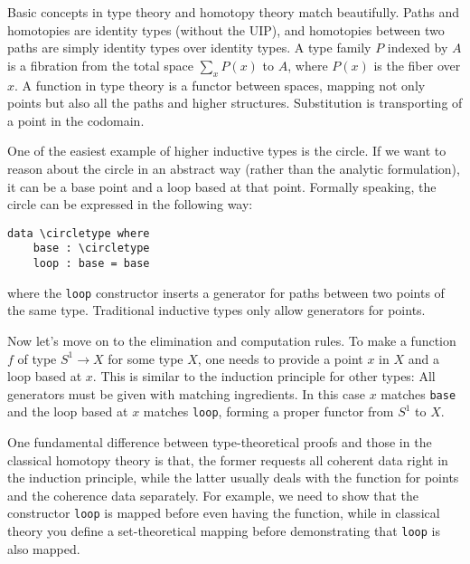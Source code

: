 \documentclass{article}
\begin{document}
Basic concepts in type theory and homotopy theory match beautifully.
Paths and homotopies are identity types (without the UIP),
and homotopies between two paths are simply identity types over identity types.
A type family $P$ indexed by $A$ is a fibration from the total space $\sum_x P(x)$ to $A$,
where $P(x)$ is the fiber over $x$.
A function in type theory is a functor between spaces,
mapping not only points but also all the paths and higher structures.
Substitution is transporting of a point in the codomain.

One of the easiest example of higher inductive types is the circle.
If we want to reason about the circle in an abstract way
(rather than the analytic formulation),
it can be a base point and a loop based at that point.
Formally speaking, the circle can be expressed in the following way:
\newcommand{\circletype}{\ensuremath{S^1}}
\begin{Verbatim}[commandchars=\\\{\}]
  data \circletype where
    base : \circletype
    loop : base = base
\end{Verbatim}
where the \texttt{loop} constructor inserts a generator for paths between
two points of the same type. Traditional inductive types
only allow generators for points.

Now let's move on to the elimination and computation rules.
To make a function $f$ of type $\circletype \to X$ for some type $X$,
one needs to provide a point $x$ in $X$ and a loop based at $x$.
This is similar to the induction principle for other types:
All generators must be given with matching ingredients.
In this case $x$ matches \texttt{base} and the loop based at $x$
matches \texttt{loop}, forming a proper functor from $\circletype$ to $X$.

One fundamental difference between type-theoretical proofs
and those in the classical homotopy theory is that, the former requests
all coherent data right in the induction principle, while the latter
usually deals with the function for points and the coherence data separately.
For example, we need to show that the constructor \texttt{loop}
is mapped before even having the function,
while in classical theory you define a set-theoretical mapping
before demonstrating that \texttt{loop} is also mapped.
\end{document}
